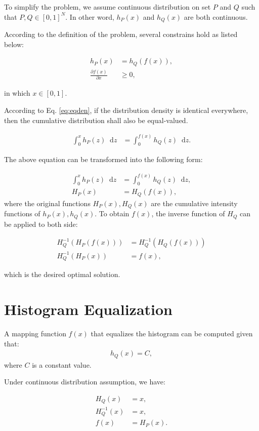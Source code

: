 \documentclass[12pt]{article}
\newcommand*\diff{\mathop{}\!\mathrm{d}}
\begin{document}
To simplify the problem, we assume continuous distribution on set $P$ and $Q$ such that $P,Q\in [0,1]^N$. In other word, $h_P(x)$ and $h_Q(x)$ are both continuous. 

According to the definition of the problem, several constrains hold as listed below:

\begin{align}
h_{P}(x) &=h_{Q}(f(x)),\label{eq:eqden} \\
\frac{\partial f(x)}{\partial x} & \ge 0,
\end{align}

in which $x \in [0,1] $.

According to Eq. \ref{eq:eqden}, if the distribution density is identical everywhere, then the cumulative distribution shall also be equal-valued.

\begin{align}
\int_0^x h_{P}(z) \diff z &= \int_0^{f(x)} h_{Q}(z) \diff z.
\end{align}

The above equation can be transformed into the following form:

\begin{align}
\int_0^{x} h_{P}(z) \diff z &= \int_0^{f(x)} h_{Q}(z) \diff z, \\
H_P(x) &= H_Q(f(x)),
\end{align}
where the original functions $H_P(x),H_Q(x)$ are the cumulative intensity functions of $h_P(x),h_Q(x)$. To obtain $f(x)$, the inverse function of $H_Q$ can be applied to both side:

\begin{align}
H^{-1}_Q \left( H_P(f(x)) \right)  &= H^{-1}_Q \left( H_Q(f(x)) \right) \\ 
H^{-1}_Q \left( H_P(x) \right) &= f(x),
\end{align}

which is the desired optimal solution.




\section{Histogram Equalization}
A mapping function $f(x)$ that equalizes the histogram can be computed given that:
\begin{align}
h_Q(x) = C,
\end{align}
where $C$ is a constant value. 

Under continuous distribution assumption, we have:

\begin{align}
H_Q(x) &= x, \\
H^{-1}_Q(x) &= x, \\
f(x) & = H_P(x).
\end{align}

\end{document}
